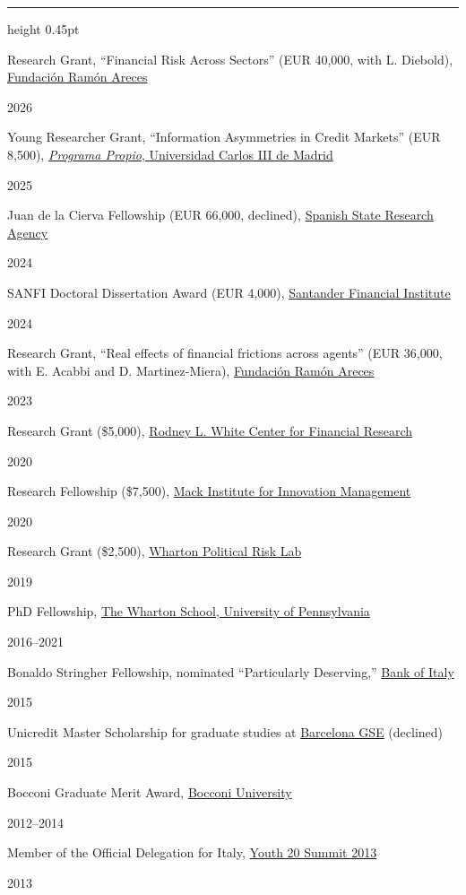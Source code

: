\documentclass[11pt,a4paper]{article}
\newcommand{\cvsection}[1]{%
  \Needspace{4.2\baselineskip}%
  \par\vspace{1.00em}%
  {\sffamily\mdseries\fontsize{10.9pt}{12.4pt}\selectfont\color{Ink}\textls[65]{\MakeUppercase{#1}}\par}%
  \vspace{0.18em}%
  {\color{RuleColor}\hrule height 0.45pt}%
  \vspace{0.43em}%
}
\newcommand{\datedentry}[3]{%
	\par\noindent
	\begin{minipage}[t]{0.82\linewidth}
		\vspace{0pt}%
		\strut #1%
		\ifstrempty{#2}{}{%
			\par\vspace{0.06em}%
			{\small\color{MutedText}#2}%
		}%
	\end{minipage}%
	\hfill
	\begin{minipage}[t]{0.15\linewidth}
		\vspace{0pt}%
		\raggedleft
		\strut{\sffamily\small\color{MutedText}#3}%
	\end{minipage}%
	\par\vspace{0.57em}%
}
\begin{document}
\cvsection{Grants, Honors \& Awards}
\datedentry{Research Grant, ``Financial Risk Across Sectors'' (EUR 40,000, with L. Diebold), \href{https://www.fundacionareces.es/fundacionareces/es/ciencias-sociales/proyectos-de-investigacion-ccss/}{Fundaci\'on Ram\'on Areces}}{}{2026}
\datedentry{Young Researcher Grant, ``Information Asymmetries in Credit Markets'' (EUR 8,500), \href{https://www.uc3m.es/investigacion-apoyopdi/financiacion/programa-propio}{\textit{Programa Propio}, Universidad Carlos III de Madrid}}{}{2025}
\datedentry{Juan de la Cierva Fellowship (EUR 66,000, declined), \href{https://www.aei.gob.es/convocatorias/buscador-convocatorias/ayudas-contratos-juan-cierva-2023}{Spanish State Research Agency}}{}{2024}
\datedentry{SANFI Doctoral Dissertation Award (EUR 4,000), \href{https://sanfi.es/}{Santander Financial Institute}}{}{2024}
\datedentry{Research Grant, ``Real effects of financial frictions across agents'' (EUR 36,000, with E. Acabbi and D. Martinez-Miera), \href{https://www.fundacionareces.es/fundacionareces/es/ciencias-sociales/proyectos-de-investigacion-ccss/}{Fundaci\'on Ram\'on Areces}}{}{2023}
\datedentry{Research Grant (\$5,000), \href{https://rodneywhitecenter.wharton.upenn.edu/}{Rodney L. White Center for Financial Research}}{}{2020}
\datedentry{Research Fellowship (\$7,500), \href{https://mackinstitute.wharton.upenn.edu/}{Mack Institute for Innovation Management}}{}{2020}
\datedentry{Research Grant (\$2,500), \href{https://impact.wharton.upenn.edu/centers-labs/political-risk-identity-lab/}{Wharton Political Risk Lab}}{}{2019}
\datedentry{PhD Fellowship, \href{http://wharton.upenn.edu/}{The Wharton School, University of Pennsylvania}}{}{2016--2021}
\datedentry{Bonaldo Stringher Fellowship, nominated ``Particularly Deserving,'' \href{http://www.bancaditalia.it/chi-siamo/lavorare-bi/borse-di-studio/index.html?com.dotmarketing.htmlpage.language=1}{Bank of Italy}}{}{2015}
\datedentry{Unicredit Master Scholarship for graduate studies at \href{http://www.barcelonagse.eu/}{Barcelona GSE} (declined)}{}{2015}
\datedentry{Bocconi Graduate Merit Award, \href{http://www.unibocconi.eu}{Bocconi University}}{}{2012--2014}
\datedentry{Member of the Official Delegation for Italy, \href{}{Youth 20 Summit 2013}}{}{2013}
\end{document}
